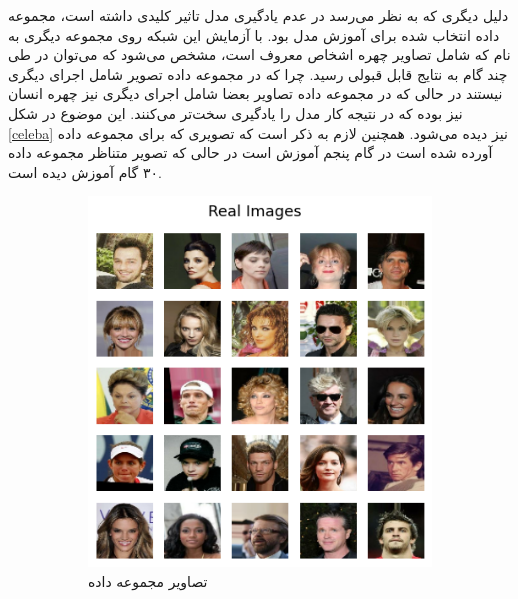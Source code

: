 \documentclass[12pt, a4paper]{book}
\begin{document}
دلیل دیگری که به نظر می‌رسد در عدم یادگیری مدل تاثیر کلیدی داشته است، مجموعه داده انتخاب شده برای آموزش
مدل بود. با آزمایش این شبکه روی مجموعه دیگری به نام  که شامل تصاویر چهره اشخاص معروف است،
مشخص می‌شود که می‌توان در طی چند‌ گام به نتایج قابل قبولی رسید. چرا که در مجموعه داده  تصویر شامل
اجرای دیگری نیستند در حالی که در مجموعه داده  تصاویر بعضا شامل اجرای دیگری نیز چهره انسان
نیز بوده که در نتیجه کار مدل را یادگیری سخت‌تر می‌کنند. این موضوع در شکل \ref{celeba} نیز دیده می‌شود.
همچنین لازم به ذکر است که تصویری که برای مجموعه داده  آورده شده است در گام پنجم آموزش است در حالی که
تصویر متناظر مجموعه داده  ۳۰ گام آموزش دیده است.

\begin{figure}[h]
    \begin{subfigure}{0.4\linewidth}
        \includegraphics[width=\linewidth]{images/celeba.png}
        \caption{تصاویر مجموعه داده }
    \end{subfigure}
    \hfill
    \begin{subfigure}{0.4\linewidth}

\end{subfigure}
\end{figure}
\end{document}
